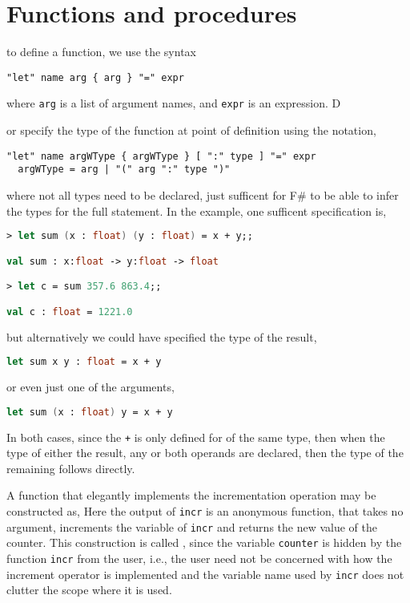 \chapter{Functions and procedures}
\label{chap:functions}

to define a function, we use the syntax
\begin{lstlisting}[language=ebnf]
  "let" name arg { arg } "=" expr
\end{lstlisting}
where \lstinline|arg| is a list of argument names, and \lstinline|expr| is an expression. D


or specify the type of the function at point of definition using the notation,
\begin{lstlisting}[language=ebnf]
  "let" name argWType { argWType } [ ":" type ] "=" expr
  argWType = arg | "(" arg ":" type ")"
\end{lstlisting}
where not all types need to be declared, just sufficent for F\# to be able to infer the types for the full statement. In the example, one sufficent specification is,
\begin{lstlisting}[language=fsharp,caption=fsharpi]
> let sum (x : float) (y : float) = x + y;;

val sum : x:float -> y:float -> float

> let c = sum 357.6 863.4;;

val c : float = 1221.0
\end{lstlisting}
but alternatively we could have specified the type of the result,
\begin{lstlisting}[language=fsharp]
  let sum x y : float = x + y
\end{lstlisting}
or even just one of the arguments,
\begin{lstlisting}[language=fsharp]
  let sum (x : float) y = x + y
\end{lstlisting}
In both cases, since the \lstinline|+|  is only defined for  of the same type, then when the type of either the result, any or both operands are declared, then the type of the remaining follows directly.





A function that elegantly implements the incrementation operation may be constructed as,
%
%
 Here the output of \texttt{incr} is an anonymous function, that takes no argument, increments the variable of \texttt{incr} and returns the new value of the counter. This construction is called , since the variable \texttt{counter} is hidden by the function \texttt{incr} from the user, i.e., the user need not be concerned with how the increment operator is implemented and the variable name used by \texttt{incr} does not clutter the scope where it is used.

